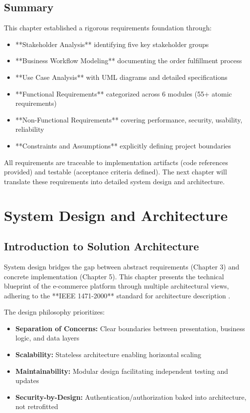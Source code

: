 \section{Summary}

This chapter established a rigorous requirements foundation through:

\begin{itemize}
    \item **Stakeholder Analysis** identifying five key stakeholder groups
    \item **Business Workflow Modeling** documenting the order fulfillment process
    \item **Use Case Analysis** with UML diagrams and detailed specifications
    \item **Functional Requirements** categorized across 6 modules (55+ atomic requirements)
    \item **Non-Functional Requirements** covering performance, security, usability, reliability
    \item **Constraints and Assumptions** explicitly defining project boundaries
\end{itemize}

All requirements are traceable to implementation artifacts (code references provided) and testable (acceptance criteria defined). The next chapter will translate these requirements into detailed system design and architecture.


\chapter{System Design and Architecture}

\section{Introduction to Solution Architecture}

System design bridges the gap between abstract requirements (Chapter 3) and concrete implementation (Chapter 5). This chapter presents the technical blueprint of the e-commerce platform through multiple architectural views, adhering to the **IEEE 1471-2000** standard for architecture description \cite{ieee1471}.

The design philosophy prioritizes:
\begin{itemize}
    \item \textbf{Separation of Concerns:} Clear boundaries between presentation, business logic, and data layers
    \item \textbf{Scalability:} Stateless architecture enabling horizontal scaling
    \item \textbf{Maintainability:} Modular design facilitating independent testing and updates
    \item \textbf{Security-by-Design:} Authentication/authorization baked into architecture, not retrofitted
\end{itemize}

